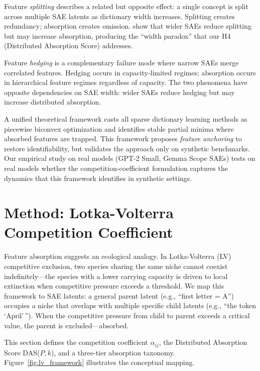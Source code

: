 \documentclass{article}
\begin{document}
Feature \emph{splitting} \citep{chanin2024absorption} describes a related but opposite effect: a single concept is split across multiple SAE latents as dictionary width increases. Splitting creates redundancy; absorption creates omission. \citet{chanin2024absorption} show that wider SAEs reduce splitting but may increase absorption, producing the ``width paradox'' that our H4 (Distributed Absorption Score) addresses.

Feature \emph{hedging} \citep{chanin2025hedging} is a complementary failure mode where narrow SAEs merge correlated features. Hedging occurs in capacity-limited regimes; absorption occurs in hierarchical feature regimes regardless of capacity. The two phenomena have opposite dependencies on SAE width: wider SAEs reduce hedging but may increase distributed absorption.

A unified theoretical framework \citep{wright2025unified} casts all sparse dictionary learning methods as piecewise biconvex optimization and identifies stable partial minima where absorbed features are trapped. This framework proposes \emph{feature anchoring} to restore identifiability, but validates the approach only on synthetic benchmarks. Our empirical study on real models (GPT-2 Small, Gemma Scope SAEs) tests on real models whether the competition-coefficient formulation captures the dynamics that this framework identifies in synthetic settings.


\section{Method: Lotka-Volterra Competition Coefficient}
\label{sec:method}

Feature absorption suggests an ecological analogy. In Lotka-Volterra (LV) competitive exclusion, two species sharing the same niche cannot coexist indefinitely---the species with a lower carrying capacity is driven to local extinction when competitive pressure exceeds a threshold. We map this framework to SAE latents: a general parent latent (e.g., ``first letter = A'') occupies a niche that overlaps with multiple specific child latents (e.g., ``the token `April'\,''). When the competitive pressure from child to parent exceeds a critical value, the parent is excluded---absorbed.

This section defines the competition coefficient $\alpha_{ij}$, the Distributed Absorption Score DAS($P, k$), and a three-tier absorption taxonomy. Figure~\ref{fig:lv_framework} illustrates the conceptual mapping.
\end{document}
